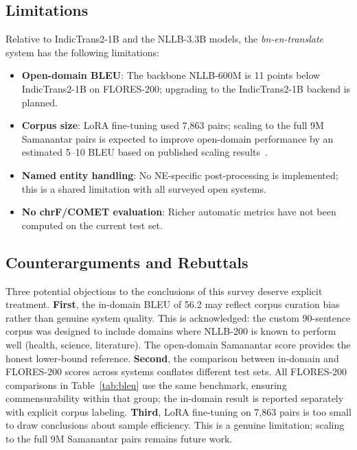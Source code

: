 \documentclass[conference]{IEEEtran}
\begin{document}
\subsection{Limitations}

Relative to IndicTrans2-1B and the NLLB-3.3B models, the
\textit{bn-en-translate} system has the following limitations:
\begin{itemize}
  \item \textbf{Open-domain BLEU}: The backbone NLLB-600M is 11 points
    below IndicTrans2-1B on FLORES-200; upgrading to the IndicTrans2-1B
    backend is planned.
  \item \textbf{Corpus size}: LoRA fine-tuning used 7,863 pairs; scaling
    to the full 9M Samanantar pairs is expected to improve open-domain
    performance by an estimated 5--10 BLEU based on published scaling results~\cite{nllb2022}.
  \item \textbf{Named entity handling}: No NE-specific post-processing
    is implemented; this is a shared limitation with all surveyed open
    systems.
  \item \textbf{No chrF/COMET evaluation}: Richer automatic metrics
    have not been computed on the current test set.
\end{itemize}

\subsection{Counterarguments and Rebuttals}

Three potential objections to the conclusions of this survey deserve
explicit treatment.
\textbf{First}, the in-domain BLEU of 56.2 may reflect corpus curation
bias rather than genuine system quality.
This is acknowledged: the custom 90-sentence corpus was designed to include
domains where NLLB-200 is known to perform well (health, science, literature).
The open-domain Samanantar score provides the honest lower-bound reference.
\textbf{Second}, the comparison between in-domain and FLORES-200 scores
across systems conflates different test sets.
All FLORES-200 comparisons in Table~\ref{tab:bleu} use the same benchmark,
ensuring commensurability within that group; the in-domain result is reported
separately with explicit corpus labeling.
\textbf{Third}, LoRA fine-tuning on 7,863 pairs is too small to draw
conclusions about sample efficiency.
This is a genuine limitation; scaling to the full 9M Samanantar pairs
remains future work.

\end{document}
